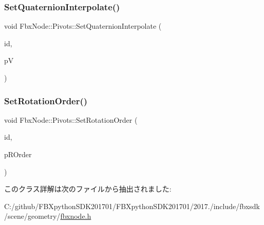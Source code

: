 \mbox{\label{class_fbx_node_1_1_pivots_a8a9dcfd646b6aa80d02952f410140b66}} 
\subsubsection{\texorpdfstring{Set\+Quaternion\+Interpolate()}{SetQuaternionInterpolate()}}
{\footnotesize\ttfamily void Fbx\+Node\+::\+Pivots\+::\+Set\+Quaternion\+Interpolate (\begin{DoxyParamCaption}\item[{int}]{id,  }\item[{\hyperlink{fbxmath_8h_a9c7a0dfb52c83256d4a92c5c6d1be72a}{E\+Fbx\+Quat\+Interp\+Mode}}]{pV }\end{DoxyParamCaption})}

\mbox{\label{class_fbx_node_1_1_pivots_a7f0f5d29498e70ed840a70c16cff355d}} 
\subsubsection{\texorpdfstring{Set\+Rotation\+Order()}{SetRotationOrder()}}
{\footnotesize\ttfamily void Fbx\+Node\+::\+Pivots\+::\+Set\+Rotation\+Order (\begin{DoxyParamCaption}\item[{int}]{id,  }\item[{\hyperlink{fbxmath_8h_ae46778666b56bb0abe5992b855fe9332}{E\+Fbx\+Rotation\+Order}}]{p\+R\+Order }\end{DoxyParamCaption})}



このクラス詳解は次のファイルから抽出されました\+:\begin{DoxyCompactItemize}
\item 
C\+:/github/\+F\+B\+Xpython\+S\+D\+K201701/\+F\+B\+Xpython\+S\+D\+K201701/2017./include/fbxsdk/scene/geometry/\hyperlink{fbxnode_8h}{fbxnode.\+h}\end{DoxyCompactItemize}
